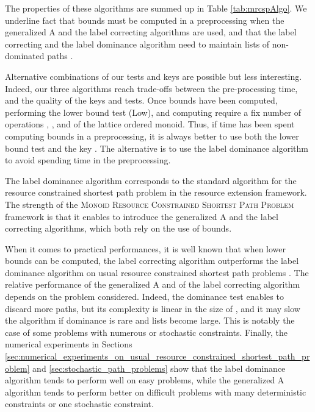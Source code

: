 \documentclass[11pt]{amsart}
\theoremstyle{plain}
\theoremstyle{remark}
\newcommand{\MRCSP}{\textsc{Monoid Resource Constrained Shortest Path Problem}\xspace}
\begin{document}
The properties of these algorithms are summed up in Table \ref{tab:mrcspAlgo}. We underline fact that bounds  must be computed in a preprocessing when the generalized A and the label correcting algorithms are used, and that the label correcting and the label dominance algorithm need to maintain lists of non-dominated paths . 

Alternative combinations of our tests and keys are possible but less interesting. Indeed, our three algorithms reach trade-offs between the pre-processing time, and the quality of the keys and tests. Once bounds  have been computed, performing the lower bound test (Low), and computing  require a fix number of operations , , and  of the lattice ordered monoid. Thus, if time has been spent computing bounds  in a preprocessing, it is always better to use both the lower bound test and the key . The alternative is to use the label dominance algorithm to avoid spending time in the preprocessing. 

The label dominance algorithm corresponds to the standard algorithm for the resource constrained shortest path problem \cite{irnich2005shortest} in the resource extension framework. The strength of the \MRCSP framework is that it enables to introduce the generalized A and the label correcting algorithms, which both rely on the use of bounds.

When it comes to practical performances, it is well known that when lower bounds  can be computed, the label correcting algorithm outperforms the label dominance algorithm on usual resource constrained shortest path problems \cite{dumitrescu2003improved}. The relative performance of the generalized A and of the label correcting algorithm depends on the problem considered. Indeed, the dominance test enables to discard more paths, but its complexity is linear in the size of , and it may slow the algorithm if dominance is rare and lists  become large. This is notably the case of some problems with numerous or stochastic constraints. Finally, the numerical experiments in Sections \ref{sec:numerical_experiments_on_usual_resource_constrained_shortest_path_problem} and \ref{sec:stochastic_path_problems} show that the label dominance algorithm tends to perform well on easy problems, while the generalized A algorithm tends to perform better on difficult problems with many deterministic constraints or one stochastic constraint.
\end{document}
